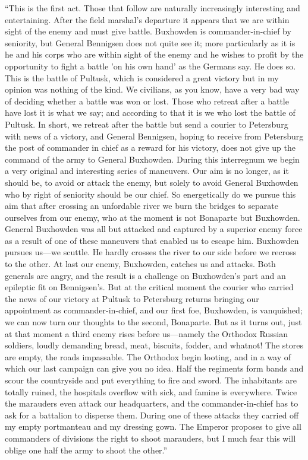 ``This is the first act. Those that follow are naturally
increasingly interesting and entertaining. After the field
marshal's departure it appears that we are within sight of the
enemy and must give battle.  Buxhowden is commander-in-chief by
seniority, but General Bennigsen does not quite see it; more
particularly as it is he and his corps who are within sight of
the enemy and he wishes to profit by the opportunity to fight a
battle 'on his own hand' as the Germans say. He does so. This is
the battle of Pultusk, which is considered a great victory but in
my opinion was nothing of the kind. We civilians, as you know,
have a very bad way of deciding whether a battle was won or
lost. Those who retreat after a battle have lost it is what we
say; and according to that it is we who lost the battle of
Pultusk. In short, we retreat after the battle but send a courier
to Petersburg with news of a victory, and General Bennigsen,
hoping to receive from Petersburg the post of commander in chief
as a reward for his victory, does not give up the command of the
army to General Buxhowden. During this interregnum we begin a
very original and interesting series of maneuvers. Our aim is no
longer, as it should be, to avoid or attack the enemy, but solely
to avoid General Buxhowden who by right of seniority should be
our chief. So energetically do we pursue this aim that after
crossing an unfordable river we burn the bridges to separate
ourselves from our enemy, who at the moment is not Bonaparte but
Buxhowden. General Buxhowden was all but attacked and captured by
a superior enemy force as a result of one of these maneuvers that
enabled us to escape him. Buxhowden pursues us---we scuttle. He
hardly crosses the river to our side before we recross to the
other. At last our enemy, Buxhowden, catches us and attacks. Both
generals are angry, and the result is a challenge on Buxhowden's
part and an epileptic fit on Bennigsen's. But at the critical
moment the courier who carried the news of our victory at Pultusk
to Petersburg returns bringing our appointment as
commander-in-chief, and our first foe, Buxhowden, is vanquished;
we can now turn our thoughts to the second, Bonaparte. But as it
turns out, just at that moment a third enemy rises before
us---namely the Orthodox Russian soldiers, loudly demanding
bread, meat, biscuits, fodder, and whatnot! The stores are empty,
the roads impassable. The Orthodox begin looting, and in a way of
which our last campaign can give you no idea. Half the regiments
form bands and scour the countryside and put everything to fire
and sword.  The inhabitants are totally ruined, the hospitals
overflow with sick, and famine is everywhere. Twice the marauders
even attack our headquarters, and the commander-in-chief has to
ask for a battalion to disperse them. During one of these attacks
they carried off my empty portmanteau and my dressing gown. The
Emperor proposes to give all commanders of divisions the right to
shoot marauders, but I much fear this will oblige one half the
army to shoot the other.''

